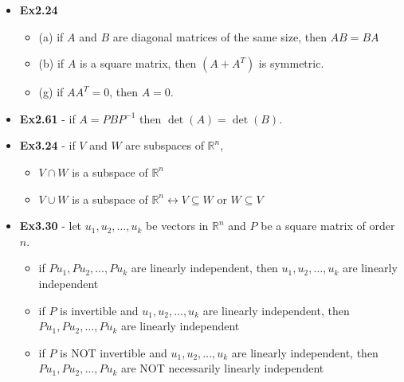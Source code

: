 \documentclass[10pt]{article}
\let\iff\leftrightarrow
\begin{document}
\raggedright
\footnotesize


\setlength{\columnseprule}{0.25pt}
\setlength{\premulticols}{1pt}
\setlength{\postmulticols}{1pt}
\setlength{\multicolsep}{1pt}
\setlength{\columnsep}{2pt}

\begin{center}
\end{center}


\begin{itemize}
    \item \textbf{Ex2.24} 
    \begin{itemize}
        \item (a) if $A$ and $B$ are diagonal matrices of the same size, then $AB = BA$
        \item (b) if $A$ is a square matrix, then $(A+A^T)$ is symmetric.
        \item (g) if $AA^T=0$, then $A=0$.
    \end{itemize}
    \item \textbf{Ex2.61} - if $A=PBP^{-1}$ then $\det(A)=\det(B)$.
    \item \textbf{Ex3.24} - if $V$ and $W$ are subspaces of $\mathbb{R}^n$,
    \begin{itemize}
        \item $V \cap W$ is a subspace of $\mathbb{R}^n$
        \item $V \cup W$ is a subspace of $\mathbb{R}^n \iff V \subseteq W$ or $W \subseteq V$
    \end{itemize}
    \item \textbf{Ex3.30} - let $u_1, u_2, \dots, u_k$ be vectors in $\mathbb{R}^n$ and $P$ be a square matrix of order $n$.
    \begin{itemize}
        \item if $Pu_1, Pu_2, \dots, Pu_k$ are linearly independent, then $u_1, u_2, \dots, u_k$ are linearly independent
        \item if $P$ is invertible and $u_1, u_2, \dots, u_k$ are linearly independent, then $Pu_1, Pu_2, \dots, Pu_k$ are linearly independent
        \item if $P$ is NOT invertible and $u_1, u_2, \dots, u_k$ are linearly independent, then $Pu_1, Pu_2, \dots, Pu_k$ are NOT necessarily linearly independent

\end{itemize}
\end{itemize}
\end{document}
